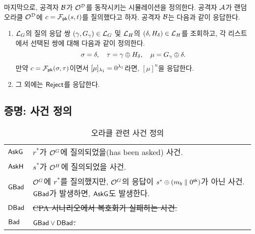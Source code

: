 
마지막으로, 공격자 $\mathcal{B}$가 $\mathcal{O}^{\mathcal{D}}$를 동작시키는 시뮬레이션을 정의한다.
공격자 $\mathcal{A}$가 랜덤 오라클 $\mathcal{O}^{\mathcal{D}}$에 $c = \mathcal{F}_{\textsf{pk}}(s, t)$를 질의했다고
하자. 공격자 $\mathcal{B}$는 다음과 같이 응답한다.
\begin{enumerate}
	\item $\mathcal{L}_{G}$의 질의 응답 쌍 $(\gamma, G_\gamma) \in \mathcal{L}_{G}$ 및 $\mathcal{L}_{H}$의
	$(\delta, H_\delta) \in \mathcal{L}_{H}$를 조회하고, 각 리스트에서 선택된 쌍에 대해
	다음과 같이 정의한다.
	$$
		\sigma = \delta, 
		\quad \tau = \gamma \oplus H_\delta, 
		\quad \mu = G_\gamma \oplus \delta.
	$$
	만약 $c = \mathcal{F}_{\textsf{pk}}(\sigma, \tau)$이면서 $[\mu]_{\lambda_1} = 0^{\lambda_1}$라면,
	$[\mu]^{n}$을 응답한다.
	\item 그 외에는 $\textsf{Reject}$를 응답한다.
\end{enumerate}

\subsection{증명: 사건 정의}

\begin{table}[ht]
	\centering
	\caption{오라클 관련 사건 정의}
	\vspace{10pt}
	\renewcommand{\arraystretch}{1.15}
	\begin{tabularx}{\textwidth}{p{1cm}X}
	\toprule
	$\textsf{AskG}$ & $r^*$가 $\mathcal{O}^{G}$에 질의되었을(has been asked) 사건. \\
	$\textsf{AskH}$ & $s^*$가 $\mathcal{O}^{H}$에 질의되었을 사건. \\
	$\textsf{GBad}$ & $\mathcal{O}^{G}$에 $r^*$를 질의했지만, $\mathcal{O}^{G}$의 응답이
	$s^* \oplus (m_{b} \parallel 0^{\textsf{sk}})$가 아닌 사건. $\textsf{GBad}$가 발생하면,
	$\textsf{AskG}$도 발생한다. \\ %
	$\textsf{DBad}$ & \sout{CPA 시나리오에서 복호화가 실패하는 사건.} \\
	$\textsf{Bad}$ & \sout{$\textsf{GBad} \vee \textsf{DBad}$.} \\
	\bottomrule
	\end{tabularx}
\end{table}

